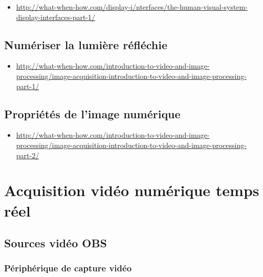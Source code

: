 \documentclass[
  french,
]{book}
\providecommand{\tightlist}{%
  \setlength{\itemsep}{0pt}\setlength{\parskip}{0pt}}
\begin{document}
\begin{itemize}
\tightlist
\item
  \url{http://what-when-how.com/display-i/nterfaces/the-human-visual-system-display-interfaces-part-1/}
\end{itemize}

\hypertarget{numuxe9riser-la-lumiuxe8re-ruxe9fluxe9chie}{%
\subsection{Numériser la lumière réfléchie}\label{numuxe9riser-la-lumiuxe8re-ruxe9fluxe9chie}}

\begin{itemize}
\tightlist
\item
  \url{http://what-when-how.com/introduction-to-video-and-image-processing/image-acquisition-introduction-to-video-and-image-processing-part-1/}
\end{itemize}

\hypertarget{propriuxe9tuxe9s-de-limage-numuxe9rique}{%
\subsection{Propriétés de l'image numérique}\label{propriuxe9tuxe9s-de-limage-numuxe9rique}}

\begin{itemize}
\tightlist
\item
  \url{http://what-when-how.com/introduction-to-video-and-image-processing/image-acquisition-introduction-to-video-and-image-processing-part-2/}
\end{itemize}

\hypertarget{acquerir_captation}{%
\section{Acquisition vidéo numérique temps réel}\label{acquerir_captation}}

\hypertarget{sources-viduxe9o-obs}{%
\subsection{Sources vidéo OBS}\label{sources-viduxe9o-obs}}

\hypertarget{puxe9riphuxe9rique-de-capture-viduxe9o}{%
\subsubsection{Périphérique de capture vidéo}\label{puxe9riphuxe9rique-de-capture-viduxe9o}}
\end{document}
